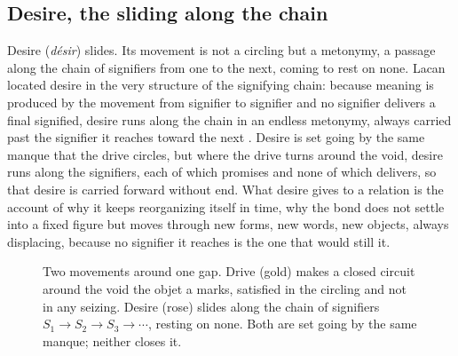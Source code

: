 \subsection*{Desire, the sliding along the chain}

Desire (\emph{désir}) slides. Its movement is not a circling but a metonymy, a passage along the chain of signifiers from one to the next, coming to rest on none. Lacan located desire in the very structure of the signifying chain: because meaning is produced by the movement from signifier to signifier and no signifier delivers a final signified, desire runs along the chain in an endless metonymy, always carried past the signifier it reaches toward the next \parencite{lacan2006ecrits}. Desire is set going by the same manque that the drive circles, but where the drive turns around the void, desire runs along the signifiers, each of which promises and none of which delivers, so that desire is carried forward without end. What desire gives to a relation is the account of why it keeps reorganizing itself in time, why the bond does not settle into a fixed figure but moves through new forms, new words, new objects, always displacing, because no signifier it reaches is the one that would still it.

\begin{figure}[t!]
\centering
{}
\caption{Two movements around one gap. Drive (gold) makes a closed circuit around the void the objet a marks, satisfied in the circling and not in any seizing. Desire (rose) slides along the chain of signifiers $S_1 \to S_2 \to S_3 \to \cdots$, resting on none. Both are set going by the same manque; neither closes it.}
\label{p26:fig:drivedesire}
\end{figure}

